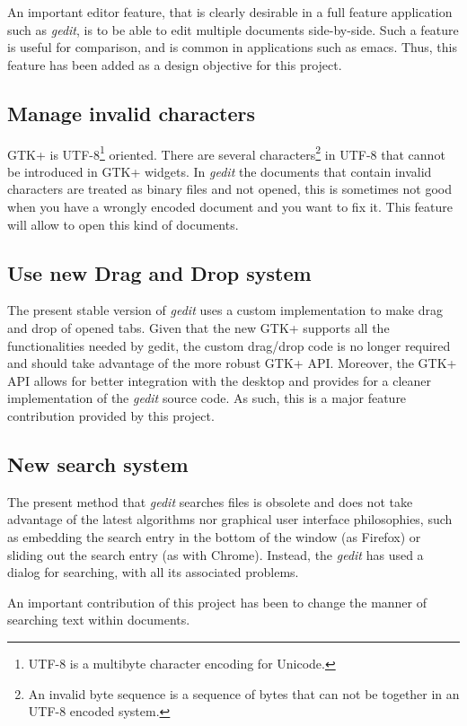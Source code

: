 An important editor feature, that is clearly desirable in a full feature application 
such as \emph{gedit}, is to be able to edit multiple documents side-by-side. 
Such a feature is useful for comparison, and is common in applications such as emacs. 
Thus, this feature has been added as a design objective for this project.


\subsection{Manage invalid characters}\label{sec:InvalidChars}

GTK+ is UTF-8\footnote{UTF-8 is a multibyte character encoding for Unicode.} oriented. There 
are several characters\footnote{An invalid byte sequence is a sequence of bytes that can not be 
together in an UTF-8 encoded system.} in UTF-8 that cannot be introduced in GTK+ widgets. 
In \emph{gedit} the documents that contain invalid characters are treated as binary files and not 
opened, this is sometimes not good when you have a wrongly encoded document and you want to fix it. 
This feature will allow to open this kind of documents.

\subsection{Use new Drag and Drop system}\label{sec:DND}

The present stable version of \emph{gedit} uses a custom implementation to make 
drag and drop of opened tabs.  Given that the new GTK+ supports all the functionalities 
needed by gedit, the custom drag/drop code is no longer required and should take advantage
of the more robust GTK+ API.  Moreover, the GTK+ API allows for better integration 
with the desktop and provides for a cleaner implementation of the \emph{gedit} source code.
As such, this is a major feature contribution provided by this project. 

\subsection{New search system}\label{sec:SearchSystem}

The present method that \emph{gedit} searches files is obsolete and does not take advantage of 
the latest algorithms nor graphical user interface philosophies, such as embedding the search 
entry in the bottom of the window (as Firefox) or sliding out the search entry (as with Chrome). 
Instead, the \emph{gedit} has used a dialog for searching, with all its associated problems. 

An important contribution of this project has been to change the manner of searching text 
within documents.
